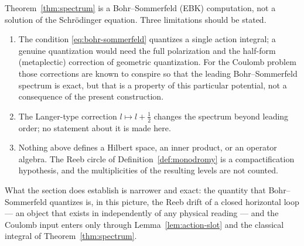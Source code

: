 \begin{warning}
\label{warn:semiclassical}
Theorem~\ref{thm:spectrum} is a Bohr--Sommerfeld (EBK) computation, not a
solution of the Schr\"odinger equation.  Three limitations should be stated.
\begin{enumerate}[label=(\alph*)]
  \item The condition \eqref{eq:bohr-sommerfeld} quantizes a single action
  integral; a genuine quantization would need the full polarization and the
  half-form (metaplectic) correction of geometric quantization.  For the Coulomb
  problem those corrections are known to conspire so that the leading
  Bohr--Sommerfeld spectrum is exact, but that is a property of this particular
  potential, not a consequence of the present construction.
  \item The Langer-type correction $l\mapsto l+\tfrac12$ changes the spectrum
  beyond leading order; no statement about it is made here.
  \item Nothing above defines a Hilbert space, an inner product, or an operator
  algebra.  The Reeb circle of Definition~\ref{def:monodromy} is a compactification
  hypothesis, and the multiplicities of the resulting levels are not counted.
\end{enumerate}
What the section does establish is narrower and exact: the quantity that
Bohr--Sommerfeld quantizes is, in this picture, the Reeb drift of a closed
horizontal loop --- an object that exists in \AEG{} independently of any physical
reading --- and the Coulomb input enters only through
Lemma~\ref{lem:action-slot} and the classical integral of
Theorem~\ref{thm:spectrum}.
\end{warning}
